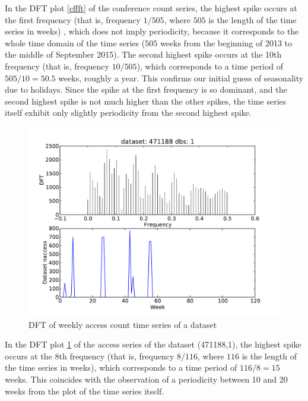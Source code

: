 \documentclass[preprint, 12pt]{elsarticle}
\begin{document}
In the DFT plot \ref{cffft} of the conference count series, the highest spike occurs at the first frequency (that is, frequency $1/505$, where $505$ is the length of the time series in weeks) , which does not imply periodicity, because it corresponds to the whole time domain of the time series ($505$ weeks from the beginning of 2013 to the middle of September 2015). The second highest spike occurs at the 10th frequency (that is, frequency $10/505$), which corresponds to a time period of $505/10 = 50.5$ weeks, roughly a year. This confirms our initial guess of seasonality due to holidays. Since the spike at the first frequency is so dominant, and the second highest spike is not much higher than the other spikes, the time series itself exhibit only slightly periodicity from the second highest spike.

\begin{figure}
\begin{center}
\includegraphics[scale=0.5]{../data/timeseries/datasets/471188_1_116_fft.pdf}
\end{center}
\caption{DFT of weekly access count time series  of a dataset}
\label{dsfft1}
\end{figure}


In the DFT plot \ref{dsfft1} of the access series of the dataset (471188,1), the highest spike occurs at the 8th frequency (that is, frequency $8/116$, where $116$ is the length of the time series in weeks), which corresponds to a time period of $116/8 = 15$ weeks. This coincides with the observation of a periodicity between 10 and 20 weeks from the plot of the time series itself.
\end{document}
